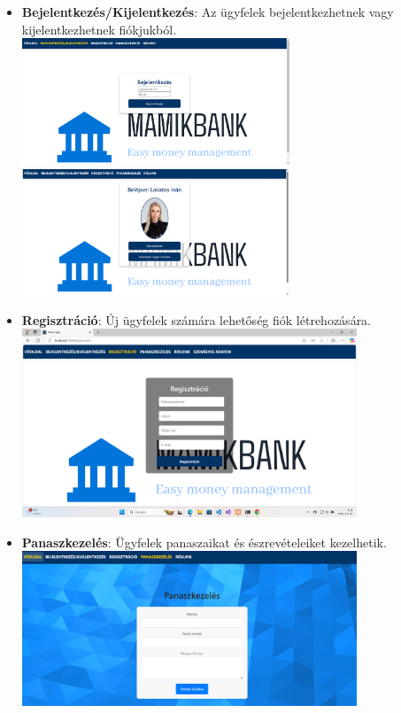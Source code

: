 \documentclass[colorlinks]{thesis-kando}
\theoremstyle{definition}
\theoremstyle{remark}
\begin{document}
\begin{itemize}
\begin{itemize}
    \item \textbf{Bejelentkezés/Kijelentkezés}: Az ügyfelek bejelentkezhetnek vagy kijelentkezhetnek fiókjukból.
    \\
    \includegraphics[width=8cm]{figures/bejelfrontend.png}
    \includegraphics[width=8cm]{figures/kijelfrontend.png}
    \item \textbf{Regisztráció}: Új ügyfelek számára lehetőség fiók létrehozására.
     \\
    \includegraphics[width=10cm]{figures/regiszfrontend.png}
    \newpage
    \item \textbf{Panaszkezelés}: Ügyfelek panaszaikat és észrevételeiket kezelhetik.
    \\
    \includegraphics[width=10cm]{figures/panaszfrontend.png}
    

\end{itemize}
\end{itemize}
\end{document}
